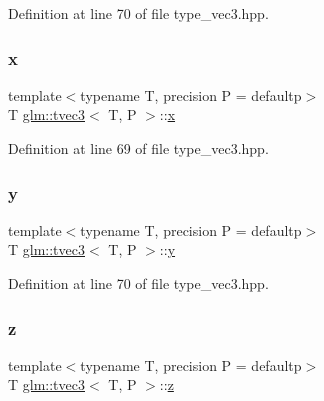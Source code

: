 Definition at line 70 of file type\+\_\+vec3.\+hpp.

\mbox{\label{structglm_1_1tvec3_a84f2c27604bd6ab7f256e3912fb8a79d}} 
\subsubsection{\texorpdfstring{x}{x}}
{\footnotesize\ttfamily template$<$typename T, precision P = defaultp$>$ \\
T \mbox{\hyperlink{structglm_1_1tvec3}{glm\+::tvec3}}$<$ T, P $>$\+::\mbox{\hyperlink{glad_8h_a92d0386e5c19fb81ea88c9f99644ab1d}{x}}}



Definition at line 69 of file type\+\_\+vec3.\+hpp.

\mbox{\label{structglm_1_1tvec3_a3969b512749f01b1afd7d60f32f50c94}} 
\subsubsection{\texorpdfstring{y}{y}}
{\footnotesize\ttfamily template$<$typename T, precision P = defaultp$>$ \\
T \mbox{\hyperlink{structglm_1_1tvec3}{glm\+::tvec3}}$<$ T, P $>$\+::\mbox{\hyperlink{glad_8h_a66ddd433d2cacfe27f5906b7e86faeed}{y}}}



Definition at line 70 of file type\+\_\+vec3.\+hpp.

\mbox{\label{structglm_1_1tvec3_aa105b56701c38430e9ac732d4f41925a}} 
\subsubsection{\texorpdfstring{z}{z}}
{\footnotesize\ttfamily template$<$typename T, precision P = defaultp$>$ \\
T \mbox{\hyperlink{structglm_1_1tvec3}{glm\+::tvec3}}$<$ T, P $>$\+::\mbox{\hyperlink{glad_8h_acb78bf1972d3eaf07da34ff2e0a2f133}{z}}}



